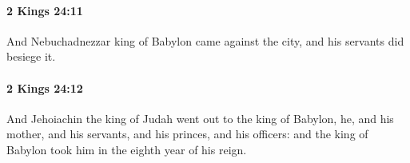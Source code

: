 		\paragraph{2 Kings 24:11} %
			\label{2KINGS-24-11}

			And Nebuchadnezzar king of Babylon came against the city, and his servants did besiege it.


		\paragraph{2 Kings 24:12} %
			\label{2KINGS-24-12}

			And Jehoiachin the king of Judah went out to the king of Babylon, he, and his mother, and his servants, and his princes, and his officers: and the king of Babylon took him in the eighth year of his reign.


